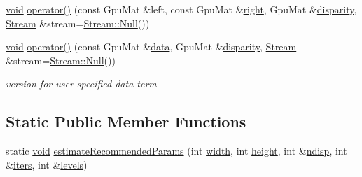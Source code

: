 \begin{DoxyCompactItemize}
\item 
\hyperlink{legacy_8hpp_a8bb47f092d473522721002c86c13b94e}{void} \hyperlink{classcv_1_1gpu_1_1StereoBeliefPropagation_acf67833fd3526b717ac25c0e015be138}{operator()} (const Gpu\-Mat \&left, const Gpu\-Mat \&\hyperlink{legacy_8hpp_a6b04b878081bf724144b73c75dfd1894}{right}, Gpu\-Mat \&\hyperlink{calib3d_8hpp_acd2ef073a3a4984e0a0ebac5c7e179fd}{disparity}, \hyperlink{classcv_1_1gpu_1_1Stream}{Stream} \&stream=\hyperlink{classcv_1_1gpu_1_1Stream_af96c23564834f88333dcb8997df553f1}{Stream\-::\-Null}())
\item 
\hyperlink{legacy_8hpp_a8bb47f092d473522721002c86c13b94e}{void} \hyperlink{classcv_1_1gpu_1_1StereoBeliefPropagation_af1ba484859a60cb5e1d5a7d4512dc7e1}{operator()} (const Gpu\-Mat \&\hyperlink{legacy_8hpp_ab9fe6c09e6d02865a953fffc12fe6ca0}{data}, Gpu\-Mat \&\hyperlink{calib3d_8hpp_acd2ef073a3a4984e0a0ebac5c7e179fd}{disparity}, \hyperlink{classcv_1_1gpu_1_1Stream}{Stream} \&stream=\hyperlink{classcv_1_1gpu_1_1Stream_af96c23564834f88333dcb8997df553f1}{Stream\-::\-Null}())
\begin{DoxyCompactList}\small\item\em version for user specified data term \end{DoxyCompactList}\end{DoxyCompactItemize}
\subsection*{Static Public Member Functions}
\begin{DoxyCompactItemize}
\item 
static \hyperlink{legacy_8hpp_a8bb47f092d473522721002c86c13b94e}{void} \hyperlink{classcv_1_1gpu_1_1StereoBeliefPropagation_a76ccf1c9d6388fa73170dd3ca83e8bce}{estimate\-Recommended\-Params} (int \hyperlink{highgui__c_8h_a2474a5474cbff19523a51eb1de01cda4}{width}, int \hyperlink{highgui__c_8h_adc7b4b8a6ef510e136071efbc9cd9a58}{height}, int \&\hyperlink{classcv_1_1gpu_1_1StereoBeliefPropagation_a0d731e1e2cfc606e05853ad240339b85}{ndisp}, int \&\hyperlink{classcv_1_1gpu_1_1StereoBeliefPropagation_a468adfcd6c5453ec3b79b496d404610f}{iters}, int \&\hyperlink{classcv_1_1gpu_1_1StereoBeliefPropagation_abf1426daac046c64ff00b02065b15caf}{levels})
\end{DoxyCompactItemize}
